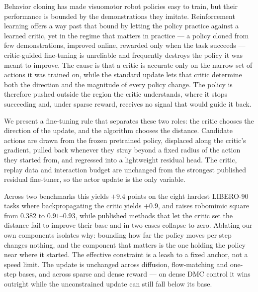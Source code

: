 Behavior cloning has made visuomotor robot policies easy to train, but their
performance is bounded by the demonstrations they imitate. Reinforcement
learning offers a way past that bound by letting the policy practice against a
learned critic, yet in the regime that matters in practice --- a policy cloned
from few demonstrations, improved online, rewarded only when the task succeeds
--- critic-guided fine-tuning is unreliable and frequently destroys the policy
it was meant to improve. The cause is that a critic is accurate only on the
narrow set of actions it was trained on, while the standard update lets that
critic determine both the direction and the magnitude of every policy change.
The policy is therefore pushed outside the region the critic understands,
where it stops succeeding and, under sparse reward, receives no signal that
would guide it back.

We present a fine-tuning rule that separates these two roles: the critic
chooses the direction of the update, and the algorithm chooses the distance.
Candidate actions are drawn from the frozen pretrained policy, displaced along
the critic's gradient, pulled back whenever they stray beyond a fixed radius of
the action they started from, and regressed into a lightweight residual head.
The critic, replay data and interaction budget are unchanged from the
strongest published residual fine-tuner, so the actor update is the only
variable.

Across two benchmarks this yields $+9.4$ points on the eight hardest LIBERO-90
tasks where backpropagating the critic yields $+0.9$, and raises robomimic
square from $0.382$ to $0.91$--$0.93$, while published methods that let the
critic set the distance fail to improve their base and in two cases collapse to
zero. Ablating our own components isolates why: bounding how far the policy
moves per step changes nothing, and the component that matters is the one
holding the policy near where it started. The effective constraint is a leash
to a fixed anchor, not a speed limit. The update is unchanged across
diffusion, flow-matching and one-step bases, and across sparse and dense
reward --- on dense DMC control it wins outright while the unconstrained
update can still fall below its base.

